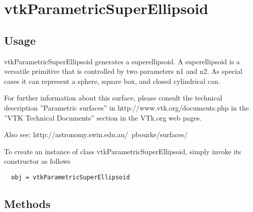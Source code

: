 \section{vtkParametricSuperEllipsoid}

\subsection{Usage}

 vtkParametricSuperEllipsoid generates a superellipsoid.  A superellipsoid
 is a versatile primitive that is controlled by two parameters n1 and
 n2. As special cases it can represent a sphere, square box, and closed
 cylindrical can.

 For further information about this surface, please consult the 
 technical description ''Parametric surfaces'' in http://www.vtk.org/documents.php 
 in the ''VTK Technical Documents'' section in the VTk.org web pages.

 Also see: http://astronomy.swin.edu.au/~pbourke/surfaces/


To create an instance of class vtkParametricSuperEllipsoid, simply
invoke its constructor as follows
\begin{verbatim}
  obj = vtkParametricSuperEllipsoid
\end{verbatim}
\subsection{Methods}

